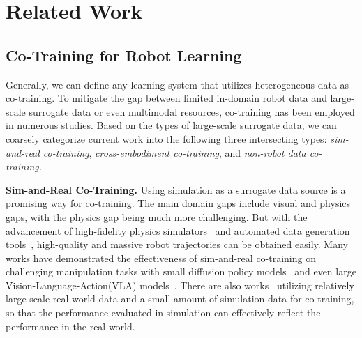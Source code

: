 \newpage
\appendix
\onecolumn
\tableofcontents

\newpage
\section{Related Work}

\subsection{Co-Training for Robot Learning}
Generally, we can define any learning system that utilizes heterogeneous data as co-training.
To mitigate the gap between limited in-domain robot data and large-scale surrogate data or even multimodal resources, co-training has been employed in numerous studies. 
Based on the types of large-scale surrogate data, we can coarsely categorize current work into the following three intersecting types: \textit{sim-and-real co-training}, \textit{cross-embodiment co-training}, and \textit{non-robot data co-training}.

\textbf{Sim-and-Real Co-Training.}
Using simulation as a surrogate data source is a promising way for co-training.
The main domain gaps include visual and physics gaps, with the physics gap being much more challenging.
But with the advancement of high-fidelity physics simulators~\cite{mittal2025isaac, nasiriany2024robocasa, zakka2025mujoco} and automated data generation tools~\cite{mandlekar2023mimicgen, jiang2025dexmimicgen, lin2025constraint}, high-quality and massive robot trajectories can be obtained easily.
Many works have demonstrated the effectiveness of sim-and-real co-training on challenging manipulation tasks with small diffusion policy models~\cite{maddukuri2025sim, wei2025empirical, cheng2025generalizable} and even large Vision-Language-Action(VLA) models~\cite{bjorck2025gr00t, yu2025real2render2real}.
There are also works~\cite{barreiros2025careful, jain2025polaris} utilizing relatively large-scale real-world data and a small amount of simulation data for co-training, so that the performance evaluated in simulation can effectively reflect the performance in the real world.


